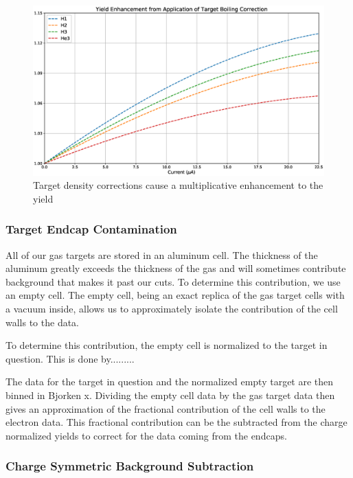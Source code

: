 \begin{figure}
	\includegraphics[width=\textwidth]{./chap3-analysis/fig/boil_yield_cor.eps}
	\caption{Target density corrections cause a multiplicative enhancement to the yield}
	\label{fig:boilyieldcor}
\end{figure}

\subsubsection{Target Endcap Contamination}
\label{sec:ecc}

All of our gas targets are stored in an aluminum cell. The thickness of the aluminum greatly exceeds the thickness of the gas and will sometimes contribute background that makes it past our cuts. To determine this contribution, we use an empty cell. The empty cell, being an exact replica of the gas target cells with a vacuum inside, allows us to approximately isolate the contribution of the cell walls to the data.

To determine this contribution, the empty cell is normalized to the target in question. This is done by.........

The data for the target in question and the normalized empty target are then binned in Bjorken x. Dividing the empty cell data by the gas target data then gives an approximation of the fractional contribution of the cell walls to the electron data. This fractional contribution can be the subtracted from the charge normalized yields to correct for the data coming from the endcaps.

\subsubsection{Charge Symmetric Background Subtraction}

